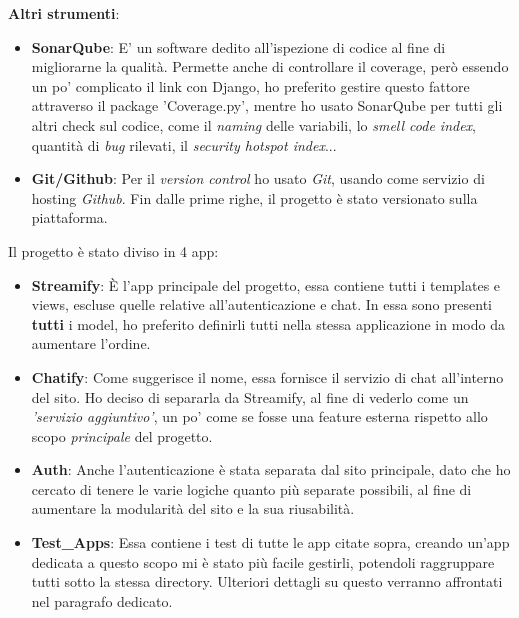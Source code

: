 \documentclass[12pt]{article}
\begin{document}
	\noindent \textbf{Altri strumenti}:
	\begin{itemize}
		\item \textbf{SonarQube}: E' un software dedito all'ispezione di codice al fine di migliorarne la qualità. Permette anche di controllare il coverage, però essendo un po' complicato il link con Django, ho preferito gestire questo fattore attraverso il package 'Coverage.py', mentre ho usato SonarQube per tutti gli altri check sul codice, come il \textit{naming} delle variabili, lo \textit{smell code index}, quantità di \textit{bug} rilevati, il \textit{security hotspot index}...
		
		\item \textbf{Git/Github}: Per il \textit{version control} ho usato \textit{Git}, usando come servizio di hosting \textit{Github}. Fin dalle prime righe, il progetto è stato versionato sulla piattaforma.
	\end{itemize}
	\pagebreak

	
	Il progetto è stato diviso in 4 app:
	
	\begin{itemize}
		\item \textbf{Streamify}: È l'app principale del progetto, essa contiene tutti i templates e views, escluse quelle relative all'autenticazione e chat. In essa sono presenti \textbf{tutti} i model, ho preferito definirli tutti nella stessa applicazione in modo da aumentare l'ordine. \\
		
		\item \textbf{Chatify}: Come suggerisce il nome, essa fornisce il servizio di chat all'interno del sito. Ho deciso di separarla da Streamify, al fine di vederlo come un \textit{'servizio aggiuntivo'}, un po' come se fosse una feature esterna rispetto allo scopo \textit{principale} del progetto. \\
		
		\item \textbf{Auth}: Anche l'autenticazione è stata separata dal sito principale, dato che ho cercato di tenere le varie logiche quanto più separate possibili, al fine di aumentare la modularità del sito e la sua riusabilità. \\
		
		\item \textbf{Test\_Apps}: Essa contiene i test di tutte le app citate sopra, creando un'app dedicata a questo scopo mi è stato più facile gestirli, potendoli raggruppare tutti sotto la stessa directory. Ulteriori dettagli su questo verranno affrontati nel paragrafo dedicato. \\
	\end{itemize}
	\pagebreak
	
\end{document}
